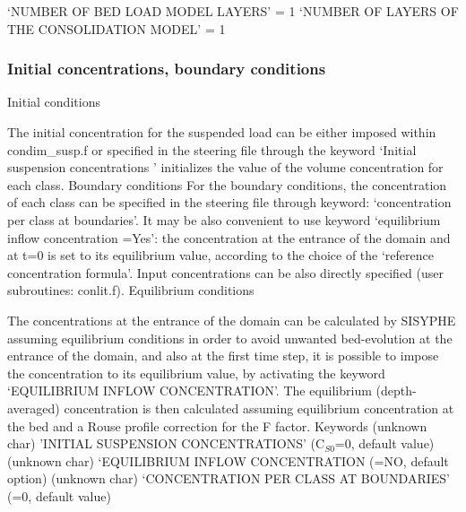 `NUMBER OF BED LOAD MODEL LAYERS' = 1 \newline
`NUMBER OF LAYERS OF THE CONSOLIDATION MODEL' = 1

\subsubsection{Initial concentrations, boundary conditions}

Initial conditions

The initial concentration for the suspended load can be either imposed
within condim\_susp.f or specified in the steering file through the keyword
`Initial suspension concentrations ' initializes the value of the volume
concentration for each class.\newline
Boundary conditions\newline
For the boundary conditions, the concentration of each class can be
specified in the steering file through keyword: `concentration per class at
boundaries'. It may be also convenient to use keyword `equilibrium inflow
concentration =Yes': the concentration at the entrance of the domain and at
t=0 is set to its equilibrium value, according to the choice of the
`reference concentration formula'. Input concentrations can be also directly
specified (user subroutines: conlit.f).\newline
Equilibrium conditions

The concentrations at the entrance of the domain can be calculated by
SISYPHE assuming equilibrium conditions in order to avoid unwanted
bed-evolution at the entrance of the domain, and also at the first time
step, it is possible to impose the concentration to its equilibrium value,
by activating the keyword `EQUILIBRIUM INFLOW CONCENTRATION'. \newline
The equilibrium (depth-averaged) concentration is then calculated assuming
equilibrium concentration at the bed and a Rouse profile correction for the
F factor.\newline
Keywords\newline
(unknown char)\hspace{5mm} 'INITIAL SUSPENSION CONCENTRATIONS' (C$_{S0}$=0,
default value)\newline
(unknown char)\hspace{5mm} `EQUILIBRIUM INFLOW CONCENTRATION (=NO, default
option)\newline
(unknown char)\hspace{5mm} `CONCENTRATION PER CLASS AT BOUNDARIES' (=0,
default value)


